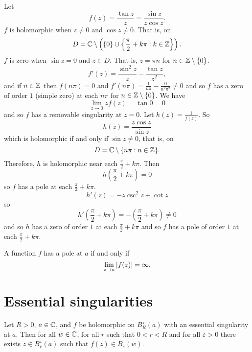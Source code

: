 
\begin{example}
    Let 
    \[
        f(z) = \frac{\tan z}{z} = \frac{\sin z}{z \cos z}.
    \]
    $f$ is holomorphic when $z \neq 0$ and $\cos z \neq 0$.
    That is, on
    \[
        D = \mathbb{C} \setminus \left( \{0\} \cup \left\{\frac\pi2 + k\pi: k \in \mathbb{Z}\right\}\right).
    \]
    $f$ is zero when $\sin z = 0$ and $z \in D$.
    That is, $z = \pi n$ for $n \in \mathbb{Z} \setminus \{0\}$.
    \[
        f'(z) = \frac{\sin^2z}{z} - \frac{\tan z}{z^2},
    \]
    and if $n \in \mathbb{Z}$ then $f(n\pi) = 0$ and 
    $f'(n\pi) = \frac{1}{n\pi} - \frac{0}{n^2\pi^2} \neq 0$
    and so $f$ has a zero of order $1$ (simple zero) at each $n \pi$ for 
    $n \in \mathbb{Z} \setminus \{0\}$.
    We have
    \[
        \lim_{z \to 0} z f(z) = \tan{0} = 0
    \]
    and so $f$ has a removable singularity at $z = 0$.
    Let $h(z) = \frac{1}{f(z)}$.
    So
    \[
        h(z) = \frac{z\cos z}{\sin z}
    \]
    which is holomorphic if and only if $\sin z \neq 0$, that is, on
    \[
        D = \mathbb{C} \setminus \{n\pi: n \in \mathbb{Z}\}.
    \]
    Therefore, $h$ is holomorphic near each $\frac\pi2 + k\pi$.
    Then
    \[
        h\left(\frac\pi2 + k\pi\right) = 0
    \]
    so $f$ has a pole at each $\frac\pi2 + k\pi$.
    \[
        h'(z) = -z \csc^2z + \cot z
    \]
    so
    \[
        h'\left(\frac\pi2 + k\pi\right) = -\left(\frac\pi2 + k\pi\right) \neq 0
    \]
    and so $h$ has a zero of order $1$ at each $\frac\pi2 + k\pi$
    and so $f$ has a pole of order $1$ at each $\frac\pi2 + k\pi$.
\end{example}

\begin{proposition}[]
    A function $f$ has a pole at $a$ if and only if
    \[
        \lim_{z \to a} \left\lvert f(z)\right\rvert = \infty.
    \]
\end{proposition}

\section{Essential singularities}

\begin{theorem}
    Let $R > 0$, $a \in \mathbb{C}$, and $f$ be holomorphic on $B_R^\star(a)$
    with an essential singularity at $a$.
    Then for all $w \in \mathbb{C}$, for all $r$ such that $0 < r < R$ and for all $\varepsilon > 0$
    there exists $z \in B_r^\star(a)$ such that $f(z) \in B_\varepsilon(w)$.
\end{theorem}

